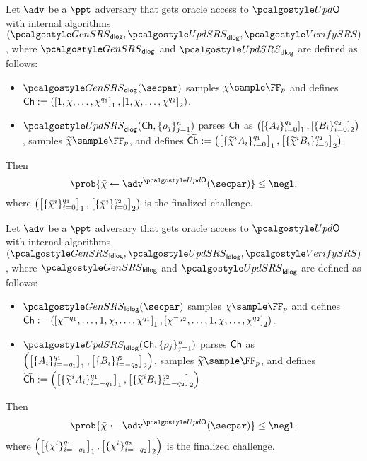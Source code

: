 {\begin{definition}\label{def:udlog}
	Let $\adv$ be a $\ppt$ adversary that gets oracle access to $\initU$ with internal algorithms $(\kgen_{\dlog}, \upd_{\dlog}, \verifyCRS)$, where $\kgen_{\dlog}$ and $\upd_{\dlog}$ are defined as follows:
	\begin{itemize}
	\item $\kgen_\dlog(\secpar)$ samples $\chi \sample \FF_p$ and defines 
		$\mathsf{Ch}:=(\left[1, \chi, \ldots,
			\chi^{q_1}\right]_{1}, \left[1, \chi, \ldots, \chi^{q_2}
		\right]_{2})$.
	\item $\upd_\dlog(\Ch, \{\rho_j \}_{j=1}^n)$ 
	parses $\mathsf{Ch}$ as $\left( \left[\{A_i\}_{i = 0}^{q_1}\right]_{1},
	\left[\{B_i\}_{i = 0}^{q_2}\right]_{2} \right)$, samples
	$\widetilde{\chi} \sample \FF_p$, and defines
	$\widetilde{\mathsf{Ch}} := 
	\left( \left[\{\widetilde{\chi}^i A_i\}_{i = 0}^{q_1}\right]_{1},
	\left[\{\widetilde{\chi}^i B_i\}_{i = 0}^{q_2}\right]_{2} \right)$.
	\end{itemize}
	Then
	\[
	\prob{\bar{\chi} \gets \adv^{\initU}(\secpar)} \leq \negl,
	\]
	where $\left( \left[\{\bar{\chi}^i\}_{i = 0}^{q_1}\right]_{1},
	\left[\{\bar{\chi}^i\}_{i = 0}^{q_2}\right]_{2} \right)$ is the finalized challenge.
\end{definition}

\begin{definition}\label{def:uldlog}
	Let $\adv$ be a $\ppt$ adversary that gets oracle access to $\initU$ with internal algorithms $(\kgen_{\ldlog}, \upd_{\ldlog}, \verifyCRS)$, where $\kgen_{\ldlog}$ and $\upd_{\ldlog}$ are defined as follows:
	\begin{itemize}
		\item $\kgen_\ldlog(\secpar)$ samples $\chi \sample \FF_p$ and defines 
		$\mathsf{Ch}:=(\left[\chi^{-q_1}, \ldots, 1, \chi, \ldots,
			\chi^{q_1}\right]_{1}, \left[\chi^{-q_2}, \ldots, 1, \chi, \ldots, \chi^{q_2}
		\right]_{2})$.
		\item $\upd_\ldlog(\Ch, \{\rho_j \}_{j=1}^n)$ 
		parses $\mathsf{Ch}$ as $\left( \left[\{A_i\}_{i = -q_1}^{q_1}\right]_{1},
		\left[\{B_i\}_{i = -q_2}^{q_2}\right]_{2} \right)$, samples
		$\widetilde{\chi} \sample \FF_p$, and defines
		$\widetilde{\mathsf{Ch}} := 
		\left( \left[\{\widetilde{\chi}^i A_i\}_{i = -q_1}^{q_1}\right]_{1},
		\left[\{\widetilde{\chi}^i B_i\}_{i = -q_2}^{q_2}\right]_{2} \right)$.
	\end{itemize}
	Then
	\[
	\prob{\bar{\chi} \gets \adv^{\initU}(\secpar)} \leq \negl,
	\]
	where $\left( \left[\{\bar{\chi}^i\}_{i = -q_1}^{q_1}\right]_{1},
	\left[\{\bar{\chi}^i\}_{i = -q_2}^{q_2}\right]_{2} \right)$ is the finalized challenge.
\end{definition}

}

